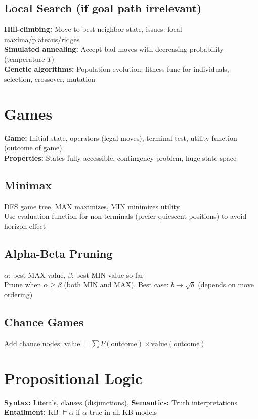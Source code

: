 \documentclass[8pt,landscape,a4paper]{article}
\begin{document}
\begin{multicols*}{3}
\subsection{Local Search (if goal path irrelevant)}
\textbf{Hill-climbing:} Move to best neighbor state, issues: local maxima/plateaus/ridges\\
\textbf{Simulated annealing:} Accept bad moves with decreasing probability (temperature $T$)\\
\textbf{Genetic algorithms:} Population evolution: fitness func for individuals, selection, crossover, mutation

\section{Games}
\textbf{Game:} Initial state, operators (legal moves), terminal test, utility function (outcome of game)\\
\textbf{Properties:} States fully accessible, contingency problem, huge state space

\subsection{Minimax}
DFS game tree, MAX maximizes, MIN minimizes utility\\
Use evaluation function for non-terminals (prefer quiescent positions) to avoid horizon effect

\subsection{Alpha-Beta Pruning}
$\alpha$: best MAX value, $\beta$: best MIN value so far\\
Prune when $\alpha \geq \beta$ (both MIN and MAX),
Best case: $b \rightarrow \sqrt{b}$ (depends on move ordering)

\subsection{Chance Games}
Add chance nodes: value = $\sum P(\text{outcome}) \times \text{value}(\text{outcome})$

\section{Propositional Logic}
\textbf{Syntax:} Literals, clauses (disjunctions), \textbf{Semantics:} Truth interpretations
\textbf{Entailment:} KB $\models \alpha$ if $\alpha$ true in all KB models


\end{multicols*}
\end{document}
